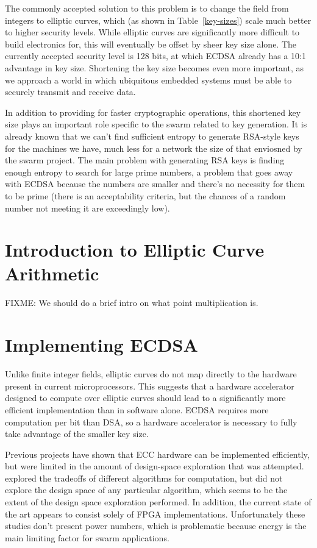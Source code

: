 \documentclass[twocolumn]{article}
\begin{document}
The commonly accepted solution to this problem is to change the field
from integers to elliptic curves, which (as shown in
Table~\ref{key-sizes}) scale much better to higher security levels.
While elliptic curves are significantly more difficult to build
electronics for, this will eventually be offset by sheer key size
alone.  The currently accepted security level is 128 bits, at which
ECDSA already has a 10:1 advantage in key size.  Shortening the key 
size becomes even more important, as we approach a world in which 
ubiquitous embedded systems must be able to securely transmit and 
receive data.

In addition to providing for faster cryptographic operations, this
shortened key size plays an important role specific to the swarm
related to key generation.  It is already known\cite{halderman-shared}
that we can't find sufficient entropy to generate RSA-style keys for
the machines we have, much less for a network the size of that
enviosned by the swarm project.  The main problem with generating RSA
keys is finding enough entropy to search for large prime numbers, a
problem that goes away with ECDSA because the numbers are smaller and
there's no necessity for them to be prime (there is an acceptability
criteria, but the chances of a random number not meeting it are
exceedingly low).

\section{Introduction to Elliptic Curve Arithmetic}

FIXME: We should do a brief intro on what point multiplication is.

\section{Implementing ECDSA}

Unlike finite integer fields, elliptic curves do not map directly to
the hardware present in current microprocessors\cite{kss-ecdsa}. This
suggests that a hardware accelerator designed to compute over elliptic
curves should lead to a significantly more efficient implementation
than in software alone.  ECDSA requires more computation per bit than
DSA, so a hardware accelerator is necessary to fully take advantage of
the smaller key size.

Previous projects\cite{nnll-ecdsa_hw} have shown that ECC hardware can
be implemented efficiently, but were limited in the amount of
design-space exploration that was attempted.  \cite{mmm-hw_ecc}
explored the tradeoffs of different algorithms for computation, but
did not explore the design space of any particular algorithm, which
seems to be the extent of the design space exploration performed.  In
addition, the current state of the art appears to consist solely of
FPGA implementations.  Unfortunately these studies don't present power
numbers, which is problematic because energy is the main limiting
factor for swarm applications.
\end{document}
